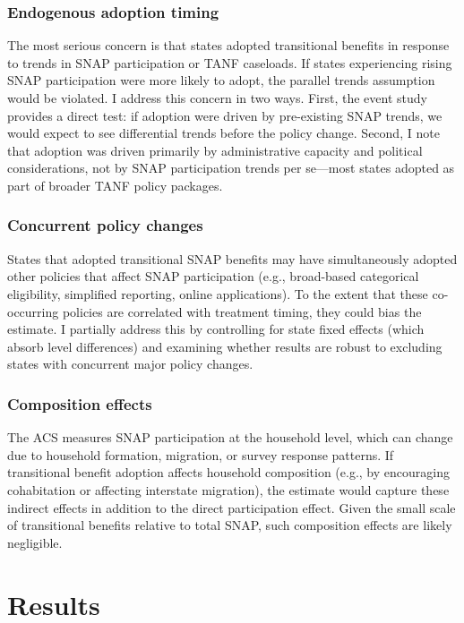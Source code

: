 \documentclass[12pt]{article}
\begin{document}
\subsubsection*{Endogenous adoption timing} The most serious concern is that states adopted transitional benefits in response to trends in SNAP participation or TANF caseloads. If states experiencing rising SNAP participation were more likely to adopt, the parallel trends assumption would be violated. I address this concern in two ways. First, the event study provides a direct test: if adoption were driven by pre-existing SNAP trends, we would expect to see differential trends before the policy change. Second, I note that adoption was driven primarily by administrative capacity and political considerations, not by SNAP participation trends per se---most states adopted as part of broader TANF policy packages.

\subsubsection*{Concurrent policy changes} States that adopted transitional SNAP benefits may have simultaneously adopted other policies that affect SNAP participation (e.g., broad-based categorical eligibility, simplified reporting, online applications). To the extent that these co-occurring policies are correlated with treatment timing, they could bias the estimate. I partially address this by controlling for state fixed effects (which absorb level differences) and examining whether results are robust to excluding states with concurrent major policy changes.

\subsubsection*{Composition effects} The ACS measures SNAP participation at the household level, which can change due to household formation, migration, or survey response patterns. If transitional benefit adoption affects household composition (e.g., by encouraging cohabitation or affecting interstate migration), the estimate would capture these indirect effects in addition to the direct participation effect. Given the small scale of transitional benefits relative to total SNAP, such composition effects are likely negligible.


\section{Results}
\end{document}
